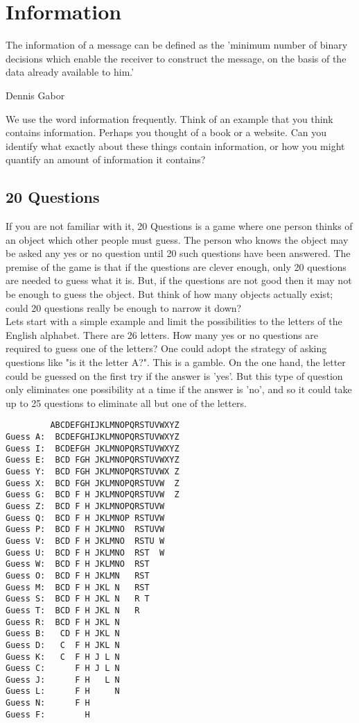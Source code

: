 \chapter{Information}

\epigraph{The information of a message can be defined as the 'minimum number of binary decisions which enable the receiver to construct the message, on the basis of the data already available to him.'}{Dennis Gabor}

We use the word information frequently. Think of an example that you think contains information. Perhaps you thought of a book or a website. Can you identify what exactly about these things contain information, or how you might quantify an amount of information it contains?

\section{20 Questions}

If you are not familiar with it, 20 Questions is a game where one person thinks of an object which other people must guess. The person who knows the object may be asked any yes or no question until 20 such questions have been answered. The premise of the game is that if the questions are clever enough, only 20 questions are needed to guess what it is. But, if the questions are not good then it may not be enough to guess the object. But think of how many objects actually exist; could 20 questions really be enough to narrow it down?\\

Lets start with a simple example and limit the possibilities to the letters of the English alphabet. There are 26 letters. How many yes or no questions are required to guess one of the letters? One could adopt the strategy of asking questions like "is it the letter A?". This is a gamble. On the one hand, the letter could be guessed on the first try if the answer is 'yes'. But this type of question only eliminates one possibility at a time if the answer is 'no', and so it could take up to 25 questions to eliminate all but one of the letters.\\

\begin{verbatim}
         ABCDEFGHIJKLMNOPQRSTUVWXYZ
Guess A:  BCDEFGHIJKLMNOPQRSTUVWXYZ
Guess I:  BCDEFGH JKLMNOPQRSTUVWXYZ
Guess E:  BCD FGH JKLMNOPQRSTUVWXYZ
Guess Y:  BCD FGH JKLMNOPQRSTUVWX Z
Guess X:  BCD FGH JKLMNOPQRSTUVW  Z
Guess G:  BCD F H JKLMNOPQRSTUVW  Z
Guess Z:  BCD F H JKLMNOPQRSTUVW
Guess Q:  BCD F H JKLMNOP RSTUVW
Guess P:  BCD F H JKLMNO  RSTUVW
Guess V:  BCD F H JKLMNO  RSTU W
Guess U:  BCD F H JKLMNO  RST  W
Guess W:  BCD F H JKLMNO  RST
Guess O:  BCD F H JKLMN   RST
Guess M:  BCD F H JKL N   RST
Guess S:  BCD F H JKL N   R T
Guess T:  BCD F H JKL N   R  
Guess R:  BCD F H JKL N   
Guess B:   CD F H JKL N   
Guess D:   C  F H JKL N   
Guess K:   C  F H J L N   
Guess C:      F H J L N   
Guess J:      F H   L N
Guess L:      F H     N
Guess N:      F H
Guess F:        H
\end{verbatim}

